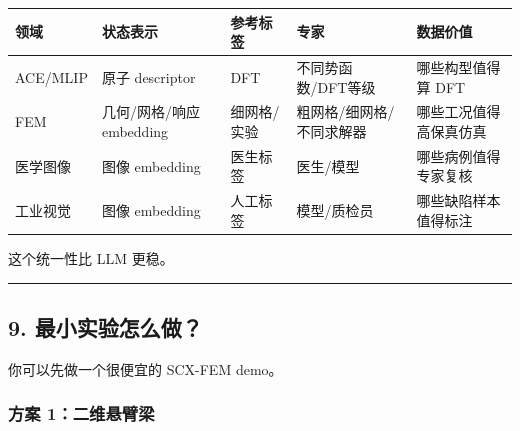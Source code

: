 \documentclass[
  12pt,
]{ctexart}
\begin{document}
\begin{longtable}[]{@{}
  >{\raggedright\arraybackslash}p{}
  >{\raggedright\arraybackslash}p{}
  >{\raggedright\arraybackslash}p{}
  >{\raggedright\arraybackslash}p{}
  >{\raggedright\arraybackslash}p{}@{}}
\toprule\noalign{}
\begin{minipage}[b]{\linewidth}\raggedright
领域
\end{minipage} & \begin{minipage}[b]{\linewidth}\raggedright
状态表示
\end{minipage} & \begin{minipage}[b]{\linewidth}\raggedright
参考标签
\end{minipage} & \begin{minipage}[b]{\linewidth}\raggedright
专家
\end{minipage} & \begin{minipage}[b]{\linewidth}\raggedright
数据价值
\end{minipage} \\
\midrule\noalign{}
\endhead
\bottomrule\noalign{}
\endlastfoot
ACE/MLIP & 原子 descriptor & DFT & 不同势函数/DFT等级 & 哪些构型值得算
DFT \\
FEM & 几何/网格/响应 embedding & 细网格/实验 & 粗网格/细网格/不同求解器
& 哪些工况值得高保真仿真 \\
医学图像 & 图像 embedding & 医生标签 & 医生/模型 &
哪些病例值得专家复核 \\
工业视觉 & 图像 embedding & 人工标签 & 模型/质检员 &
哪些缺陷样本值得标注 \\
\end{longtable}

这个统一性比 LLM 更稳。

\begin{center}\rule{0.5\linewidth}{0.5pt}\end{center}

\subsection{9.
最小实验怎么做？}\label{ux6700ux5c0fux5b9eux9a8cux600eux4e48ux505a}

你可以先做一个很便宜的 SCX-FEM demo。

\subsubsection{方案
1：二维悬臂梁}\label{ux65b9ux6848-1ux4e8cux7ef4ux60acux81c2ux6881}
\end{document}
